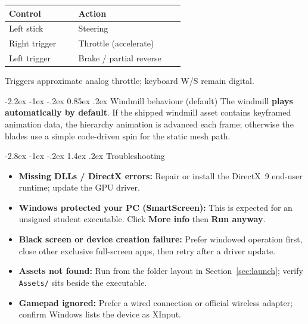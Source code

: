 \documentclass[11pt,a4paper]{article}
\makeatletter
\renewcommand\section{\@startsection{section}{1}{\z@}%
  {-2.8ex \@plus -1ex \@minus -.2ex}%
  {1.4ex \@plus .2ex}%
  {\reset@font\Large\bfseries\color{Brand}}}
\renewcommand\subsection{\@startsection{subsection}{2}{\z@}%
  {-2.2ex \@plus -1ex \@minus -.2ex}%
  {0.85ex \@plus .2ex}%
  {\reset@font\large\bfseries\color{BrandLight}}}
\newcommand{\sectionrule}{%
  \par\vspace{-0.35em}\noindent{\color{RuleGray}\rule{\linewidth}{0.55pt}}\par\vspace{0.6em}}
\makeatother
\begin{document}
\begin{center}
\begin{tabular}{@{}>{\raggedright\arraybackslash}p{0.34\linewidth}p{0.52\linewidth}@{}}
  \toprule
  \textbf{Control} & \textbf{Action} \\
  \midrule
  Left stick & Steering \\
  Right trigger & Throttle (accelerate) \\
  Left trigger & Brake / partial reverse \\
  \bottomrule
\end{tabular}
\end{center}

\noindent
Triggers approximate analog throttle; keyboard W/S remain digital.

\subsection{Windmill behaviour (default)}
\noindent
The windmill \textbf{plays automatically by default}. If the shipped windmill asset contains keyframed animation data, the hierarchy animation is advanced each frame; otherwise the blades use a simple code-driven spin for the static mesh path.

\section{Troubleshooting}\sectionrule

\begin{itemize}
  \item \textbf{Missing DLLs / DirectX errors:} Repair or install the DirectX~9 end-user runtime; update the GPU driver.
  \item \textbf{Windows protected your PC (SmartScreen):} This is expected for an unsigned student executable. Click \textbf{More info} then \textbf{Run anyway}.
  \item \textbf{Black screen or device creation failure:} Prefer windowed operation first, close other exclusive full-screen apps, then retry after a driver update.
  \item \textbf{Assets not found:} Run from the folder layout in Section~\ref{sec:launch}; verify \texttt{Assets/} sits beside the executable.
  \item \textbf{Gamepad ignored:} Prefer a wired connection or official wireless adapter; confirm Windows lists the device as XInput.
\end{itemize}
\end{document}
